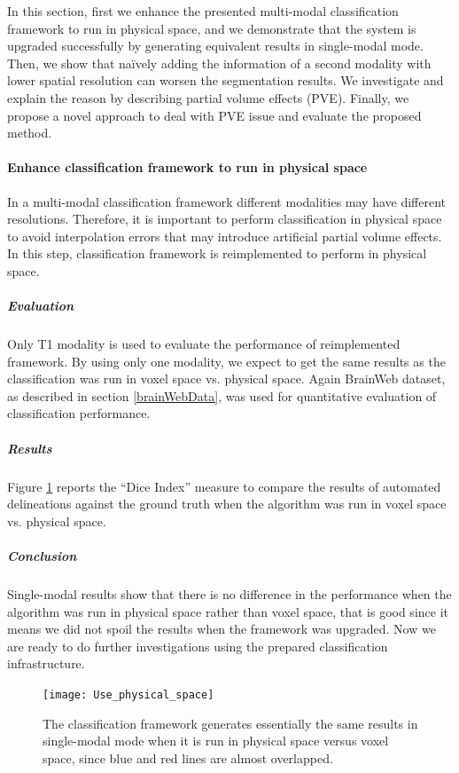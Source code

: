 In this section, first we enhance the presented multi-modal classification framework to run in physical space, and we demonstrate that the system is upgraded successfully by generating equivalent results in single-modal mode.
Then, we show that na\"{i}vely adding the information of a second modality with lower spatial resolution can worsen the segmentation results. We investigate and explain the reason by describing partial volume effects (PVE). Finally, we propose a novel approach to deal with PVE issue and evaluate the proposed method.

\paragraph{Enhance classification framework to run in physical space} %

In a multi-modal classification framework different modalities may have different resolutions.
Therefore, it is important to perform classification in physical space to avoid interpolation errors that may introduce artificial partial volume effects.
In this step, classification framework is reimplemented to perform in physical space.

\subparagraph{Evaluation}
Only T1 modality is used to evaluate the performance of reimplemented framework. By using only one modality, we expect to get the same results as the classification was run in voxel space vs. physical space.
Again BrainWeb dataset, as described in section \ref{brainWebData}, was used for quantitative evaluation of classification performance.

\subparagraph{Results}
Figure \ref{Use_physical_space} reports the ``Dice Index'' measure to compare the results of automated delineations against the ground truth when the algorithm was run in voxel space vs. physical space.

\subparagraph{Conclusion}
Single-modal results show that there is no difference in the performance when the algorithm was run in physical space rather than voxel space, that is good since it means we did not spoil the results when the framework was upgraded. Now we are ready to do further investigations using the prepared classification infrastructure.

\begin{figure}[ht]
\centering
\texttt{[image: Use\_physical\_space]}\
\centering
\caption{The classification framework generates essentially the same results in single-modal mode when it is run in physical space versus voxel space, since blue and red lines are almost overlapped.}
\label{Use_physical_space}
\end{figure}

